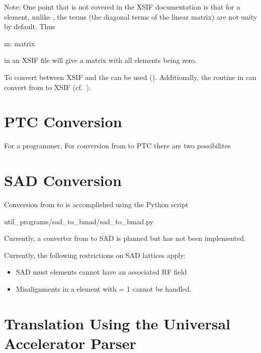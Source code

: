 Note: One point that is not covered in the XSIF documentation is that
for a  element, unlike \mad, the  terms (the
diagonal terms of the linear matrix) are not unity by default. Thus
\begin{example}
  m: matrix
\end{example}
in an XSIF file will give a matrix with all elements being zero.

To convert between XSIF and \bmad the  can be used (). Additionally, the
 routine in \bmad can convert from \bmad to
XSIF (cf.~).

\section{PTC Conversion}
\label{s:ptc.convert}

For a programmer, 
For conversion from \bmad to PTC there are two possibilites

\section{SAD Conversion}
\label{s:sad.convert}

Conversion from \cite{b:sad} to \bmad is accomplished using the Python script
\begin{example}
  util_programs/sad_to_bmad/sad_to_bmad.py
\end{example}
Currently, a converter from \bmad to SAD is planned but has not been implemented.

Currently, the following restrictions on SAD lattices apply:
  \begin{itemize}
  \item
SAD must elements cannot have an associated RF field
  \item
Misalignments in a  element with  = 1 cannot be handled.
  \end{itemize}

\section{Translation Using the Universal Accelerator Parser}
\label{s:aml}

